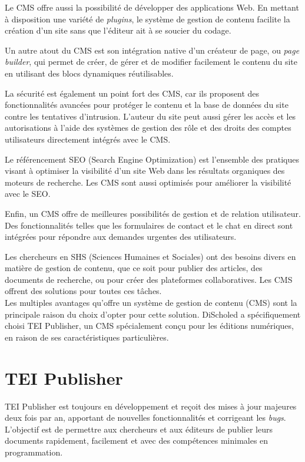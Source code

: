 Le CMS offre aussi la possibilité de développer des applications Web. En mettant à disposition une variété de \textit{plugins}, le système de gestion de contenu facilite la création d'un site sans que l'éditeur ait à se soucier du codage.

Un autre atout du CMS est son intégration native d'un créateur de page, ou \textit{page builder}, qui permet de créer, de gérer et de modifier facilement le contenu du site en utilisant des blocs dynamiques réutilisables.

La sécurité est également un point fort des CMS, car ils proposent des fonctionnalités avancées pour protéger le contenu et la base de données du site contre les tentatives d'intrusion. L'auteur du site peut aussi gérer les accès et les autorisations à l'aide des systèmes de gestion des rôle et des droits des comptes utilisateurs directement intégrés avec le CMS.

Le référencement SEO (Search Engine Optimization)  est l'ensemble des pratiques visant à optimiser la visibilité d'un site Web dans les résultats organiques des moteurs de recherche. Les CMS sont aussi optimisés pour améliorer la visibilité avec le SEO. 

Enfin, un CMS offre de meilleures possibilités de gestion et de relation utilisateur. Des fonctionnalités telles que les formulaires de contact et le chat en direct sont intégrées pour répondre aux demandes urgentes des utilisateurs.

Les chercheurs en SHS (Sciences Humaines et Sociales) ont des besoins divers en matière de gestion de contenu, que ce soit pour publier des articles, des documents de recherche, ou pour créer des plateformes collaboratives. Les CMS offrent des solutions pour toutes ces tâches.\\

Les multiples avantages qu'offre un système de gestion de contenu (CMS) sont la principale raison du choix d'opter pour cette solution. DiScholed a spécifiquement choisi TEI Publisher, un CMS spécialement conçu pour les éditions numériques, en raison de ses caractéristiques particulières.

\section{TEI Publisher}

TEI Publisher est toujours en développement et reçoit des mises à jour majeures deux fois par an, apportant de nouvelles fonctionnalités et corrigeant les \textit{bugs}. L'objectif est de permettre aux chercheurs et aux éditeurs de publier leurs documents rapidement, facilement et avec des compétences minimales en programmation. 

